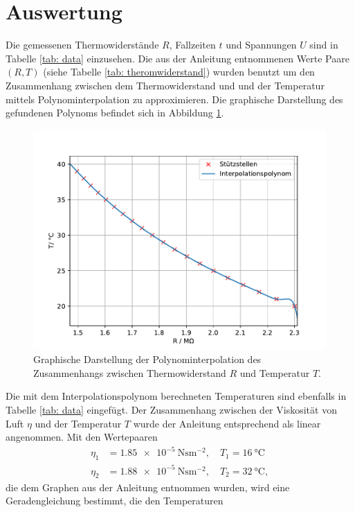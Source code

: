 \section{Auswertung}
Die gemessenen Thermowiderstände $R$, Fallzeiten $t$ und Spannungen $U$ sind in Tabelle \ref{tab: data} einzusehen.
Die aus der Anleitung entnommenen Werte Paare $(R, T)$ (siehe Tabelle \ref{tab: theromwiderstand}) wurden benutzt um den Zusammenhang
zwischen dem Thermowiderstand und und der Temperatur mittels Polynominterpolation zu approximieren. Die graphische
Darstellung des gefundenen Polynoms befindet sich in Abbildung \ref{fig: poly}.

\begin{figure}
  \centering
  \includegraphics[width = \textwidth]{../Messdaten/temperature_fit.pdf}
  \caption{Graphische Darstellung der Polynominterpolation des Zusammenhangs zwischen Thermowiderstand $R$ und Temperatur $T$.}
  \label{fig: poly}
\end{figure}
 Die mit dem Interpolationspolynom berechneten
Temperaturen sind ebenfalls in Tabelle \ref{tab: data} eingefügt. Der Zusammenhang zwischen der Viskosität von Luft $\eta$ und
der Temperatur $T$ wurde der Anleitung \cite{} entsprechend als linear angenommen. Mit den Wertepaaren
\begin{align}
  \eta_1 &= \SI{1.85e-5}{\newton\second\meter^{-2}}, \quad T_1 = \SI{16}{\celsius} \\
  \eta_2 &= \SI{1.88e-5}{\newton\second\meter^{-2}}, \quad T_2 = \SI{32}{\celsius},
\end{align}
die dem Graphen aus der Anleitung entnommen wurden, wird eine Geradengleichung bestimmt, die den Temperaturen

